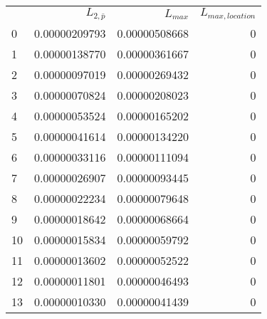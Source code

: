 \begin{tabular}{lrrr}
 & $L_{2,\bar{p}}$ & $L_{max}$ & $L_{max,location}$ \\
0 & 0.00000209793 & 0.00000508668 & 0 \\
1 & 0.00000138770 & 0.00000361667 & 0 \\
2 & 0.00000097019 & 0.00000269432 & 0 \\
3 & 0.00000070824 & 0.00000208023 & 0 \\
4 & 0.00000053524 & 0.00000165202 & 0 \\
5 & 0.00000041614 & 0.00000134220 & 0 \\
6 & 0.00000033116 & 0.00000111094 & 0 \\
7 & 0.00000026907 & 0.00000093445 & 0 \\
8 & 0.00000022234 & 0.00000079648 & 0 \\
9 & 0.00000018642 & 0.00000068664 & 0 \\
10 & 0.00000015834 & 0.00000059792 & 0 \\
11 & 0.00000013602 & 0.00000052522 & 0 \\
12 & 0.00000011801 & 0.00000046493 & 0 \\
13 & 0.00000010330 & 0.00000041439 & 0 \\
\end{tabular}
